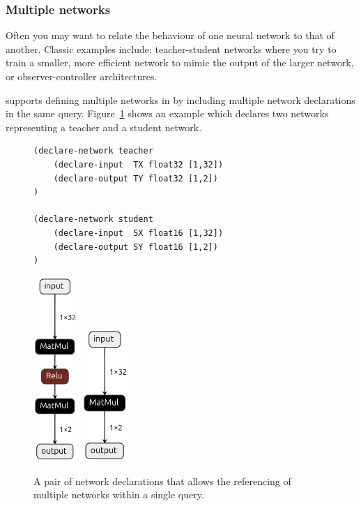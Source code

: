 \subsubsection{Multiple networks}
\label{sec:multiple-network}

Often you may want to relate the behaviour of one neural network to that of another. Classic examples include: teacher-student networks where you try to train a smaller, more efficient network to mimic the output of the larger network, or observer-controller architectures.

\vnnlib{} supports defining multiple networks in by including multiple network declarations in the same query. Figure~\ref{fig:multiple-networks} 
shows an example which declares two networks representing a teacher and a student network.

\begin{figure}[h!]
    \begin{minipage}[c]{0.64\textwidth}
        \begin{lstlisting}[style=lbnf]
(declare-network teacher
    (declare-input  TX float32 [1,32])
    (declare-output TY float32 [1,2])
)

(declare-network student
    (declare-input  SX float16 [1,32])
    (declare-output SY float16 [1,2])
)\end{lstlisting}
    \end{minipage}
    \begin{minipage}[c]{0.35\textwidth}
        \centering
        \includegraphics[height=7cm]{imgs/teacher_net.onnx.png}
        \vspace{0.5cm} 
        \includegraphics[height=5cm]{imgs/student_net.onnx.png}
    \end{minipage}
    \caption{A pair of \vnnlib{} network declarations that allows the referencing of multiple networks within a single query.}
    \label{fig:multiple-networks}
\end{figure}

